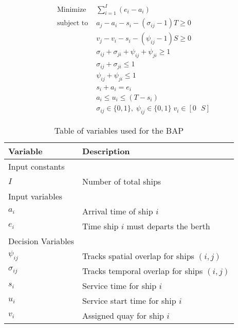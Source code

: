 \documentclass[11pt,a4paper,final]{article}
\begin{document}
\begin{subequations}
\label{eq:generalbap}
\label{eq:bapconstrs}
\begin{align}
    \text{Minimize }   & \sum_{i=1}^I (e_i - a_i)                                       \label{subeq:bapobj}    \\
    \text{subject to } &a_j - a_i - s_i - (\sigma_{ij} - 1)T \geq 0                         \label{subeq:baptemporal}         \\
                       &v_j - v_i - s_i - (\psi_{ij} - 1)S \geq 0                         \label{subeq:bapspatial}        \\
                       &\sigma_{ij} + \sigma_{ji} + \psi_{ij} + \psi_{ji} \geq 1                       \label{subeq:bapvalidpos}    \\
                       &\sigma_{ij} + \sigma_{ji} \leq 1                                         \label{subeq:bapsigma}        \\
                       &\psi_{ij} + \psi_{ji} \leq 1                                         \label{subeq:bappsi}        \\
                       &s_i + a_i = e_i                                             \label{subeq:bapdetach}       \\
                       &a_i \leq u_i \leq (T - s_i)                                       \label{subeq:bapvalidtime} \\
                       &\sigma_{ij} \in \{0,1\},\;\psi_{ij} \in \{0,1\}\; v_i \in [0 \mbox{ } S ] \label{subeq:bapspaces}
\end{align}
\end{subequations}

\begin{table}[htbp]
\caption{\label{tab:bapvariables}Table of variables used for the BAP}
\centering
\begin{tabular}{ll}
\textbf{Variable} & \textbf{Description}\\[0pt]
\hline
Input constants & \\[0pt]
\(I\) & Number of total ships\\[0pt]
\hline
Input variables & \\[0pt]
\(a_i\) & Arrival time of ship \(i\)\\[0pt]
\(e_i\) & Time ship \(i\) must departs the berth\\[0pt]
\hline
Decision Variables & \\[0pt]
\(\psi_{ij}\) & Tracks spatial overlap for ships \((i,j)\)\\[0pt]
\(\sigma_{ij}\) & Tracks temporal overlap for ships \((i,j)\)\\[0pt]
\(s_i\) & Service time for ship \(i\)\\[0pt]
\(u_i\) & Service start time for ship \(i\)\\[0pt]
\(v_i\) & Assigned quay for ship \(i\)\\[0pt]
\hline
\end{tabular}
\end{table}
\end{document}
